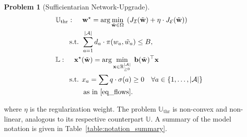 \documentclass[letterpaper, 10 pt, conference]{ieeeconf}  %
\newtheorem{problem}{Problem}
\begin{document}
\begin{problem}[Sufficientarian Network-Upgrade]  
\begin{align}
& \mathbb{U}_{\text{thr}}: \quad  \,  \mathbf{w}^{\star}  = \arg\min_{\tilde{\mathbf{w}} \in \Omega} \; \left (  J_{\mathcal{I}}(\tilde{\mathbf{w}}) + \eta \cdot J_{\mathcal{E}} (\tilde{\mathbf{w}})   \right ) \\ 
& \quad \quad  \text{s.t. }   \sum_{a=1}^{|\mathcal{A}|} d_{a} \cdot \pi(w_{a},\tilde{w}_{a})  \leq B,  \nonumber \\
& \mathbb{L}: \quad \,  \mathbf{x}^\star(\tilde{\mathbf{w}}) = \arg\min_{\mathbf{x} \in \mathbb{R}^{|\mathcal{A}|}_{\geq 0}} \; \mathbf{b}(\tilde{\mathbf{w}})^\top \mathbf{x} \label{eq_utilitarian_obj} \\
& \quad \quad  \text{s.t. }   x_a = \sum q \cdot \sigma(a) \geq 0  \quad \forall a \in \left \{ 1,\dots, |\mathcal{A}| \right   \}  \label{eq_utilitarian_constraints} \\
& \quad \quad  \quad \quad  \text{as in \eqref{eq_flows}}. \nonumber
\end{align}
\end{problem}
where $\eta$ is the regularization weight. The problem $\mathbb{U}_{\text{thr}}$ is non-convex and non-linear, analogous to its respective counterpart $\mathbb{U}$. A summary of the model notation is given in Table~\ref{table:notation_summary}.
\end{document}
